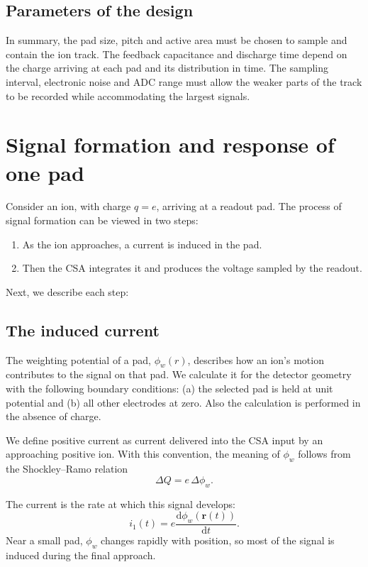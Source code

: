 \documentclass[pdflatex,iicol,sn-mathphys-num]{sn-jnl}
\newcommand{\dd}{\mathrm{d}}
\begin{document}
\subsection{Parameters of the design}

In summary, the pad size, pitch and active area must be chosen to sample and contain the ion track. The feedback capacitance and discharge time depend on the charge arriving at each pad and its distribution in time. The sampling interval, electronic noise and ADC range must allow the weaker parts of the track to be recorded while accommodating the largest signals.


\section{Signal formation and response of one pad}
\label{sec:single_ion}

Consider an ion, with charge $q=e$, arriving at a readout pad. The process of signal formation can be viewed in two steps:
\begin{enumerate}
\item As the ion approaches, a current is induced in the pad. 
\item Then the CSA integrates it and produces the voltage sampled by the readout.
\end{enumerate}

Next, we describe each step:

\subsection{The induced current}

The weighting potential of a pad, $\phi_{w}(r)$, describes how an ion’s motion contributes to the signal on that pad. We calculate it for the detector geometry with the following boundary conditions: (a) the selected pad is held at unit potential and (b) all other electrodes at zero. Also the calculation is performed in the absence of charge. 

We define positive current as current delivered into the CSA input by an approaching positive ion. With this convention, the meaning of $\phi_w$ follows from the Shockley--Ramo relation~\cite{riegler2016}
\begin{equation}
 \Delta Q=e\,\Delta\phi_w.
 \label{eq:single_charge}
\end{equation}

The current is the rate at which this signal develops:
\begin{equation}
 i_1(t)=e\frac{\dd\phi_w(\mathbf r(t))}{\dd t}.
 \label{eq:single_ramo}
\end{equation}
Near a small pad, $\phi_w$ changes rapidly with position, so most of the signal is induced during the final approach. 
\end{document}
